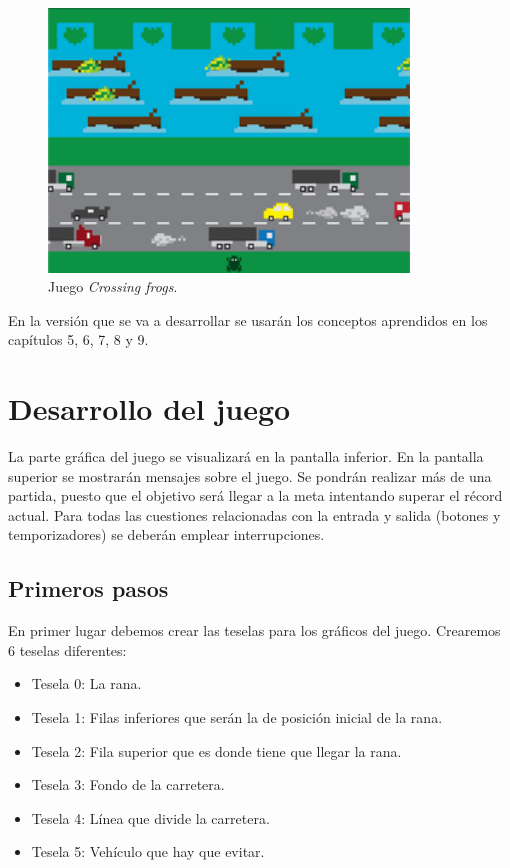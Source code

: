 \begin{figure}[t]
	\centering
	\includegraphics[height=7cm]{Figuras/C10/c10_frogs.png}
	\caption{Juego \textit{Crossing frogs}.}
	\label{fig:c7_frogs}
\end{figure}

En la versión que se va a desarrollar se usarán los conceptos aprendidos en los capítulos 5, 6, 7, 8 y 9. 

\section{Desarrollo del juego}
La parte gráfica del juego se visualizará en la pantalla inferior. En la pantalla superior se mostrarán mensajes sobre el juego. Se pondrán realizar más de una partida, puesto que el objetivo será llegar a la meta intentando superar el récord actual. Para todas las cuestiones relacionadas con la entrada y salida (botones y temporizadores) se deberán emplear interrupciones.

\subsection{Primeros pasos}
En primer lugar debemos crear las teselas para los gráficos del juego. Crearemos 6 teselas diferentes:
\begin{itemize}
	\item Tesela 0: La rana.
	\item Tesela 1: Filas inferiores que serán la de posición inicial de la rana.
	\item Tesela 2: Fila superior que es donde tiene que llegar la rana.
	\item Tesela 3: Fondo de la carretera.
	\item Tesela 4: Línea que divide la carretera.
	\item Tesela 5: Vehículo que hay que evitar.
\end{itemize}


